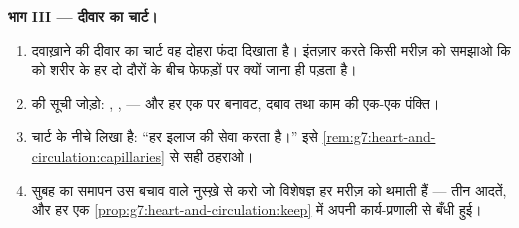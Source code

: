 \begin{problem}[{सप्ताहांत समस्या --- चार परामर्श, और जाल का एक
नक़्शा}]
\medskip\noindent\textbf{भाग III --- दीवार का चार्ट।}
\begin{enumerate}[resume]
  \item दवाख़ाने की दीवार का चार्ट वह दोहरा फंदा दिखाता है। इंतज़ार
        करते किसी मरीज़ को समझाओ कि  को शरीर के हर दो दौरों के
        बीच फेफड़ों पर क्यों जाना ही पड़ता है।
  \item {} की सूची जोड़ो: , ,  --- और हर एक पर
        बनावट, दबाव तथा काम की एक-एक पंक्ति।
  \item चार्ट के नीचे लिखा है: ``हर इलाज  की सेवा करता
        है।'' इसे \cref{rem:g7:heart-and-circulation:capillaries}
        से सही ठहराओ।
  \item सुबह का समापन उस बचाव वाले नुस्ख़े से करो जो विशेषज्ञ हर
        मरीज़ को थमाती हैं --- तीन आदतें, और हर एक
        \cref{prop:g7:heart-and-circulation:keep} में अपनी
        कार्य-प्रणाली से बँधी हुई।
\end{enumerate}
\end{problem}
